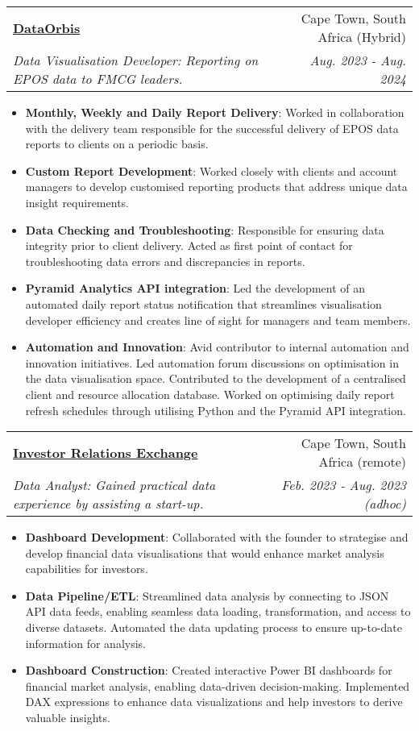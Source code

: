 \documentclass[a4paper,11pt]{article}
\makeatletter
\newcommand{\resumeItem}[2]{
  \item\small{
    \textbf{#1}{: #2 \vspace{-2pt}}
  }
}
\newcommand{\resumeSubheading}[4]{
  \vspace{-1pt}\item
    \begin{tabular*}{0.97\textwidth}[t]{l@{\extracolsep{\fill}}r}
      \textbf{#1} & #2 \\
      \textit{\small#3} & \textit{\small #4} \\
  \end{tabular*}\vspace{-10pt}
}
\newcommand{\resumeItemListStart}{\begin{itemize}}
\newcommand{\resumeItemListEnd}{\end{itemize}\vspace{-10pt}}
\makeatother
\begin{document}
    \resumeSubheading
      {\href{http://dataorbis.com}{DataOrbis}}{Cape Town, South Africa (Hybrid)}
      {Data Visualisation Developer: Reporting on EPOS data to FMCG leaders.}{Aug. 2023 - Aug. 2024}
    
      \resumeItemListStart
        \resumeItem{Monthly, Weekly and Daily Report Delivery}
          {Worked in collaboration with the delivery team responsible for the successful delivery of EPOS data reports to clients on a periodic basis.}
        \resumeItem{Custom Report Development}
          {Worked closely with clients and account managers to develop customised reporting products that address unique data insight requirements.}
        \resumeItem{Data Checking and Troubleshooting}
          {Responsible for ensuring data integrity prior to client delivery. Acted as first point of contact for troubleshooting data errors and discrepancies in reports.}
        \resumeItem{Pyramid Analytics API integration}
          {Led the development of an automated daily report status notification that streamlines visualisation developer efficiency and creates line of sight for managers and team members.}
        \resumeItem{Automation and Innovation}
          {Avid contributor to internal automation and innovation initiatives. Led automation forum discussions on optimisation in the data visualisation space. Contributed to the development of a centralised client and resource allocation database. Worked on optimising daily report refresh schedules through utilising Python and the Pyramid API integration.}
      \resumeItemListEnd

    \resumeSubheading
      {\href{http://irx.exchange/metals-gold}{Investor Relations Exchange}}{Cape Town, South Africa (remote)}
      {Data Analyst: Gained practical data experience by assisting a start-up.}{Feb. 2023 - Aug. 2023 (adhoc)}
      
      \resumeItemListStart
        \resumeItem{Dashboard Development}
          {Collaborated with the founder to strategise and develop financial data visualisations that would enhance market analysis capabilities for investors.}
        \resumeItem{Data Pipeline/ETL}
          {Streamlined data analysis by connecting to JSON API data feeds, enabling seamless data loading, transformation, and access to diverse datasets. Automated the data updating process to ensure up-to-date information for analysis.}
        \resumeItem{Dashboard Construction}
          { Created interactive Power BI dashboards for financial market analysis, enabling data-driven decision-making. Implemented DAX expressions to enhance data visualizations and help investors to derive valuable insights.}
      \resumeItemListEnd
\end{document}
